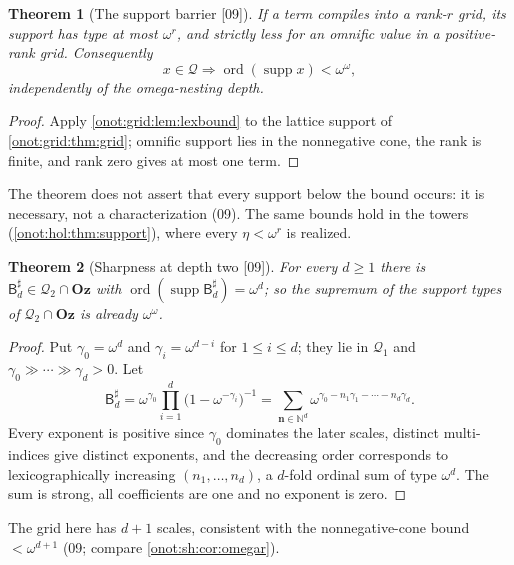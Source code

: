 \documentclass[11pt,oneside]{article}
\numberwithin{equation}{section}
\newtheorem{theorem}{Theorem}[section]
\theoremstyle{definition}
\theoremstyle{remark}
\newcommand{\Oz}{\mathbf{Oz}}
\newcommand{\N}{\mathbb N}
\newcommand{\QO}{\mathcal Q}
\newcommand{\sB}{\mathsf B}
\newcommand{\supp}{\operatorname{supp}}
\newcommand{\ord}{\operatorname{ord}}
\newcommand{\src}[1]{\textup{\textsf{\small[#1]}}}
\begin{document}
\begin{theorem}[The support barrier \src{09}]\label{onot:grid:thm:supportbound}
If a term compiles into a rank-$r$ grid, its support has type at most $\omega^r$,
and strictly less for an omnific value in a positive-rank grid. Consequently
\begin{equation}\label{onot:grid:eq:supportbarrier}
 x\in\QO\Longrightarrow\ord(\supp x)<\omega^\omega,
\end{equation}
independently of the omega-nesting depth.
\end{theorem}
\begin{proof}
Apply \cref{onot:grid:lem:lexbound} to the lattice support of
\cref{onot:grid:thm:grid}; omnific support lies in the nonnegative cone, the rank
is finite, and rank zero gives at most one term.
\end{proof}
The theorem does not assert that every support below the bound occurs: it is
necessary, not a characterization (09). The same bounds hold in the towers
(\cref{onot:hol:thm:support}), where every $\eta<\omega^r$ is realized.

\begin{theorem}[Sharpness at depth two \src{09}]\label{onot:grid:thm:sharp}
For every $d\ge1$ there is $\sB^\sharp_d\in\QO_2\cap\Oz$ with
$\ord(\supp\sB^\sharp_d)=\omega^d$; so the supremum of the support types of
$\QO_2\cap\Oz$ is already $\omega^\omega$.
\end{theorem}
\begin{proof}
Put $\gamma_0=\omega^d$ and $\gamma_i=\omega^{d-i}$ for $1\le i\le d$; they lie in
$\QO_1$ and $\gamma_0\gg\cdots\gg\gamma_d>0$. Let
\begin{equation}\label{onot:grid:eq:sharp}
 \sB^\sharp_d=\omega^{\gamma_0}\prod_{i=1}^d\bigl(1-\omega^{-\gamma_i}\bigr)^{-1}
 =\sum_{\mathbf n\in\N^d}\omega^{\gamma_0-n_1\gamma_1-\cdots-n_d\gamma_d}.
\end{equation}
Every exponent is positive since $\gamma_0$ dominates the later scales, distinct
multi-indices give distinct exponents, and the decreasing order corresponds to
lexicographically increasing $(n_1,\ldots,n_d)$, a $d$-fold ordinal sum of type
$\omega^d$. The sum is strong, all coefficients are one and no exponent is zero.
\end{proof}
The grid here has $d+1$ scales, consistent with the nonnegative-cone bound
$<\omega^{d+1}$ (09; compare \cref{onot:sh:cor:omegar}).
\end{document}
